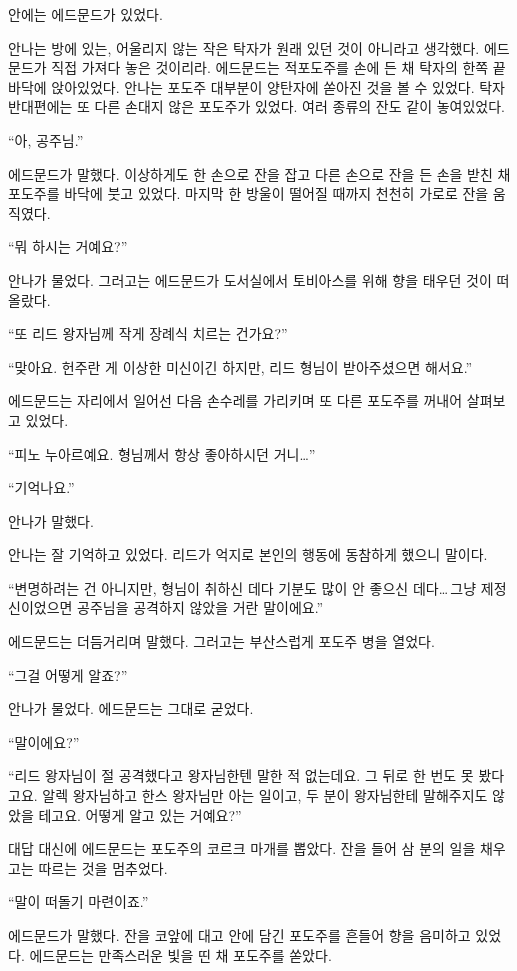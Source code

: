 안에는 에드문드가 있었다.

안나는 방에 있는, 어울리지 않는 작은 탁자가 원래 있던 것이 아니라고 생각했다. 에드문드가 직접 가져다 놓은 것이리라. 에드문드는 적포도주를 손에 든 채 탁자의 한쪽 끝 바닥에 앉아있었다. 안나는 포도주 대부분이 양탄자에 쏟아진 것을 볼 수 있었다. 탁자 반대편에는 또 다른 손대지 않은 포도주가 있었다. 여러 종류의 잔도 같이 놓여있었다.

``아, 공주님.''

에드문드가 말했다. 이상하게도 한 손으로 잔을 잡고 다른 손으로 잔을 든 손을 받친 채 포도주를 바닥에 붓고 있었다. 마지막 한 방울이 떨어질 때까지 천천히 가로로 잔을 움직였다.

``뭐 하시는 거예요?''

안나가 물었다. 그러고는 에드문드가 도서실에서 토비아스를 위해 향을 태우던 것이 떠올랐다.

``또 리드 왕자님께 작게 장례식 치르는 건가요?''

``맞아요. 헌주란 게 이상한 미신이긴 하지만, 리드 형님이 받아주셨으면 해서요.''

에드문드는 자리에서 일어선 다음 손수레를 가리키며 또 다른 포도주를 꺼내어 살펴보고 있었다.

``피노 누아르예요. 형님께서 항상 좋아하시던 거니\ldots''

``기억나요.''

안나가 말했다.

안나는 잘 기억하고 있었다. 리드가 억지로 본인의 행동에 동참하게 했으니 말이다.

``변명하려는 건 아니지만, 형님이 취하신 데다 기분도 많이 안 좋으신 데다\ldots\,그냥 제정신이었으면 공주님을 공격하지 않았을 거란 말이에요.''

에드문드는 더듬거리며 말했다. 그러고는 부산스럽게 포도주 병을 열었다.

``그걸 어떻게 알죠?''

안나가 물었다. 에드문드는 그대로 굳었다.

`` 말이에요?''

``리드 왕자님이 절 공격했다고 왕자님한텐 말한 적 없는데요. 그 뒤로 한 번도 못 봤다고요. 알렉 왕자님하고 한스 왕자님만 아는 일이고, 두 분이 왕자님한테 말해주지도 않았을 테고요. 어떻게 알고 있는 거예요?''

대답 대신에 에드문드는 포도주의 코르크 마개를 뽑았다. 잔을 들어 삼 분의 일을 채우고는 따르는 것을 멈추었다.

``말이 떠돌기 마련이죠.''

에드문드가 말했다. 잔을 코앞에 대고 안에 담긴 포도주를 흔들어 향을 음미하고 있었다. 에드문드는 만족스러운 빛을 띤 채 포도주를 쏟았다.

